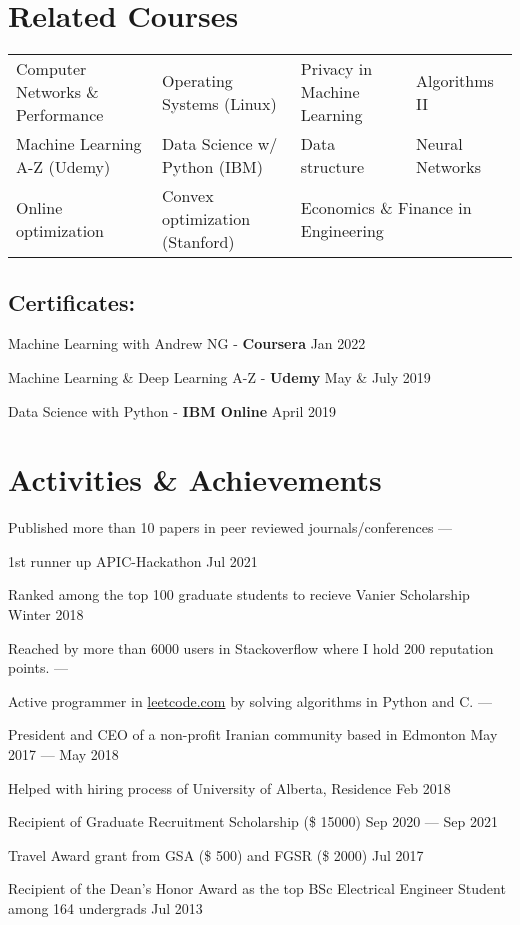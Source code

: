 \documentclass[letter,11pt]{article}
\begin{document}
\section{Related Courses}
\begin{tabular}{p{5.9cm}p{5.3cm}p{5cm}p{5cm}}
	Computer Networks \& Performance & Operating Systems (Linux) & Privacy in Machine Learning & Algorithms II\\
	Machine Learning A-Z (Udemy) & Data Science w/ Python (IBM) & Data structure & Neural Networks \\
	Online optimization & Convex optimization (Stanford) & \multicolumn{2}{l}{Economics \& Finance in Engineering}\\
\end{tabular}
\subsection{Certificates:}
\begin{zitemize}
	\item Machine Learning with Andrew NG - \textbf{Coursera} \hfill Jan 2022
	\item Machine Learning \& Deep Learning A-Z - \textbf{Udemy} \hfill May \& July 2019
	\item Data Science with Python - \textbf{IBM Online} \hfill April 2019
\end{zitemize}



\section{Activities \& Achievements}
Published more than 10 papers in peer reviewed journals/conferences  \hfill ---

 	1st runner up APIC-Hackathon	\hfill Jul 2021

Ranked among the top 100 graduate students to recieve Vanier Scholarship	\hfill Winter 2018

Reached by more than 6000 users in Stackoverflow where I hold 200 reputation points. \hfill ---

Active programmer in \href{www.leetcode.com}{leetcode.com}  by solving algorithms in Python and C. \hfill ---

President and CEO of a non-profit Iranian community based in Edmonton \hfill May 2017 --- May 2018

Helped with hiring process of University of Alberta, Residence \hfill Feb 2018

Recipient of Graduate Recruitment Scholarship (\$ 15000) \hfill Sep 2020 --- Sep 2021

Travel Award grant from GSA (\$ 500) and FGSR (\$ 2000) \hfill Jul 2017

Recipient of the Dean's Honor Award as the top BSc Electrical Engineer Student among 164 undergrads \hfill Jul 2013
\end{document}
